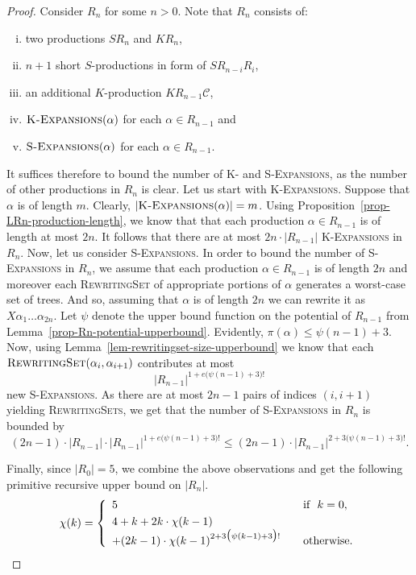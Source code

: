 \documentclass[11pt,a4paper]{amsart}
\theoremstyle{definition}
\newcommand{\KExpansions}[1]{\textsc{K-Expansions}(#1)}
\newcommand{\SExpansions}[1]{\textsc{S-Expansions}(#1)}
\newcommand{\RewritingSet}[2]{\textsc{RewritingSet}(#1,#2)}
\newcommand{\potential}[1]{\pi(#1)}
\begin{document}
\begin{proof}
Consider $R_n$ for some $n > 0$. Note that $R_n$ consists of:
\begin{enumerate}[(i)]
\item two productions $S R_n$ and $K R_n$,
\item $n + 1$ short $S$-productions in form of $S R_{n-i} R_i$,
\item an additional $K$-production $K R_{n-1} \mathcal{C}$,
\item $\KExpansions{\alpha}$ for each $\alpha \in R_{n-1}$ and
\item $\SExpansions{\alpha}$ for each $\alpha \in R_{n-1}$.
\end{enumerate}

It suffices therefore to bound the number of \textsc{K-} and \textsc{S-Expansions}, as
the number of other productions in $R_n$ is clear. Let us start with \textsc{K-Expansions}. Suppose that $\alpha$ is of length $m$. Clearly, $|\KExpansions{\alpha}| = m$. Using Proposition~\ref{prop-LRn-production-length}, we know that that each production $\alpha \in R_{n-1}$ is of length at most $2n$. It follows that there are at most $2 n \cdot |R_{n-1}|$ \textsc{K-Expansions} in $R_n$. Now, let us consider \textsc{S-Expansions}. In order to bound the number of \textsc{S-Expansions} in $R_n$, we assume that each production $\alpha \in R_{n-1}$ is of length $2n$ and moreover each \textsc{RewritingSet} of appropriate portions of $\alpha$ generates a worst-case set of trees. And so, assuming that $\alpha$ is of length $2n$ we can rewrite it as $ X \alpha_1 \ldots \alpha_{2n}$. Let $\psi$ denote the upper bound function on the potential of $R_{n-1}$ from Lemma~\ref{prop-Rn-potential-upperbound}. Evidently, $\potential{\alpha} \leq \psi(n-1) + 3$. Now, using Lemma~\ref{lem-rewritingset-size-upperbound} we know that each $\RewritingSet{\alpha_i}{\alpha_{i+1}}$ contributes at most \[{|R_{n-1}|}^{1 + e\big(\psi(n-1) + 3\big)!} \]
new \textsc{S-Expansions}. As there are at most $2n-1$ pairs of indices $(i,i+1)$ yielding \textsc{RewritingSets}, we get that the number of \textsc{S-Expansions} in $R_n$ is bounded by
\[ (2n-1) \cdot |R_{n-1}| \cdot {|R_{n-1}|}^{1 + e\big(\psi(n-1) + 3\big)!} \leq (2n-1) \cdot {|R_{n-1}|}^{2 + 3 \big(\psi(n-1) + 3\big)!}. \]

Finally, since $|R_0| = 5$, we combine the above observations and get the following primitive recursive upper bound on $|R_n|$.
\begin{equation*}
  \chi(k) = \left\{\begin{array}{r@{}l@{\qquad}l}
    & 5 & \text{if }\ k = 0, \\[\jot]
    & 4 + k + 2k \cdot \chi(k-1) &\\
    & + (2k-1) \cdot {\chi(k-1)}^{2 + 3 \big(\psi(k-1) + 3\big)!} & \text{otherwise.}
  \end{array}\right.
\end{equation*}
\end{proof}
\end{document}
